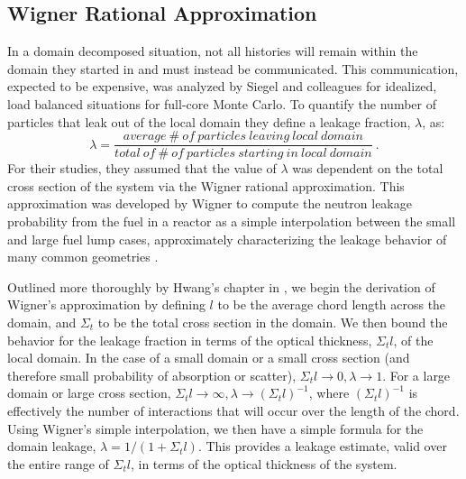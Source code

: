 \documentclass[letterpaper,12pt]{article}
\begin{document}
\subsection{Wigner Rational Approximation}
In a domain decomposed situation, not all histories will remain
within the domain they started in and must instead be
communicated. This communication, expected to be expensive, was
analyzed by Siegel and colleagues for idealized, load balanced
situations for full-core Monte Carlo\cite{siegel_analysis_2012}.  To
quantify the number of particles that leak out of the local domain
they define a leakage fraction, $\lambda$, as:
\begin{equation}
  \lambda = \frac{average\ \#\ of\ particles\ leaving\ local\ domain}
          {total\ of\ \#\ of\ particles\ starting\ in\ local\ domain}\:.
  \label{eq:leakage_fraction}
\end{equation}
For their studies, they assumed that the value of $\lambda$ was
dependent on the total cross section of the system via the Wigner
rational approximation. This approximation was developed by Wigner to
compute the neutron leakage probability from the fuel in a reactor as
a simple interpolation between the small and large fuel lump cases,
approximately characterizing the leakage behavior of many common
geometries \cite{duderstadt_nuclear_1976}. 

Outlined more thoroughly by Hwang's chapter in
\cite{azmy_nuclear_2010}, we begin the derivation of Wigner's
approximation by defining $l$ to be the average chord length across
the domain, and $\Sigma_t$ to be the total cross section in the
domain. We then bound the behavior for the leakage fraction in terms
of the optical thickness, $\Sigma_t l$, of the local domain. In the
case of a small domain or a small cross section (and therefore small
probability of absorption or scatter), $\Sigma_t l \rightarrow 0,
\lambda \rightarrow 1$. For a large domain or large cross section,
$\Sigma_t l \rightarrow \infty, \lambda \rightarrow (\Sigma_t
l)^{-1}$, where $(\Sigma_t l)^{-1}$ is effectively the number of
interactions that will occur over the length of the chord. Using
Wigner's simple interpolation, we then have a simple formula for the
domain leakage, $\lambda = 1/(1+\Sigma_t l)$. This provides a leakage
estimate, valid over the entire range of $\Sigma_t l$, in terms of the
optical thickness of the system.
\end{document}
